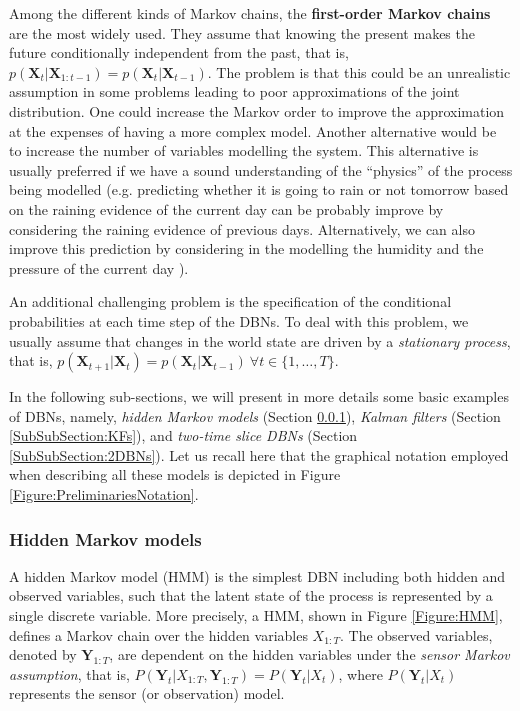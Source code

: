 Among the different kinds of Markov chains, the \textbf{first-order Markov chains} are the most widely used. They assume that knowing the present makes the future conditionally independent from the past, that is, $p(\bm X_t| \bm X_{1:t-1})  = p(\bm X_t|\bm X_{t-1})$. The problem is that this could be an unrealistic assumption in some problems leading to poor approximations of the joint distribution. One could increase the Markov order to improve the approximation at the expenses of having a more complex model. Another  alternative \cite{russelNorvig2009} would be to increase the number of variables modelling the system. This alternative is usually preferred if we have a sound understanding of the ``physics''  of the process being modelled (e.g. predicting whether it is going to rain or not tomorrow based on the raining evidence of the current day can be probably improve by considering the raining evidence of previous days. Alternatively, we can also improve this prediction by considering in the modelling the humidity and the pressure of the current day \cite{russelNorvig2009}). 

An additional challenging problem is the specification of the conditional probabilities at each time step of the DBNs. To deal with this problem, we usually assume that changes in the world state are driven by a \textit{stationary process}, that is, $p(\bm X_{t+1}|\bm X_{t}) = p(\bm X_t|\bm X_{t-1})\ \forall t \in\{1,\ldots,T\}$. 

In the following sub-sections, we will present in more details some basic examples of DBNs, namely, \textit{hidden Markov models} (Section \ref{SubSubSection:HMMs}), \textit{Kalman filters} (Section \ref{SubSubSection:KFs}), and \textit{two-time slice DBNs} (Section \ref{SubSubSection:2DBNs}). Let us recall here that the graphical notation employed when describing all these models is depicted in Figure \ref{Figure:PreliminariesNotation}.

\subsubsection{Hidden Markov models}\label{SubSubSection:HMMs}

A hidden Markov model (HMM) is the simplest DBN including both hidden and observed variables, such that the latent state of the process is represented by a single discrete variable. More precisely, a HMM, shown in Figure \ref{Figure:HMM}, defines a Markov chain over the hidden variables $X_{1:T}$. The observed variables, denoted by $\bm Y_{1:T}$, are dependent on the hidden variables under the \textit{sensor Markov assumption}, that is, $P(\bm Y_t| X_{1:T}, \bm Y_{1:T}) = P(\bm Y_t| X_t)$, where $P(\bm Y_t| X_t)$ represents the sensor (or observation) model.  


